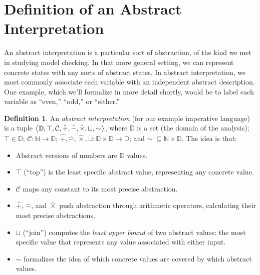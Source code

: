\documentclass{amsbook}
\theoremstyle{definition}
\newtheorem{definition}[theorem]{Definition}
\theoremstyle{remark}
\numberwithin{section}{chapter}
\numberwithin{equation}{chapter}
\begin{document}
\section{Definition of an Abstract Interpretation}

An abstract interpretation is a particular sort of abstraction, of the kind we met in studying model checking.
In that more general setting, we can represent concrete states with any sorts of abstract states.
In abstract interpretation, we most commonly associate each variable with an independent abstract description.
One example, which we'll formalize in more detail shortly, would be to label each variable as ``even,'' ``odd,'' or ``either.''

\newcommand{\join}[0]{\sqcup}

\begin{definition}
  An \emph{abstract interpretation} (for our example imperative language) is a tuple $\angled{\mathbb D, \top, \mathcal C, \hat{+}, \hat{-}, \hat{\times}, \join, \sim}$, where $\mathbb D$ is a set (the domain of the analysis); $\top \in \mathbb D$; $\mathcal C : \mathbb N \to \mathbb D$; $\hat{+}, \hat{-}, \hat{\times}, \join : \mathbb D \times \mathbb D \to \mathbb D$; and $\sim \; \subseteq \mathbb N \times \mathbb D$.
  The idea is that:
  \begin{itemize}
  \item Abstract versions of numbers are $\mathbb D$ values.
  \item $\top$ (``top'') is the least specific abstract value, representing any concrete value.
  \item $\mathcal C$ maps any constant to its most precise abstraction.
  \item $\hat{+}$, $\hat{-}$, and $\hat{\times}$ push abstraction through arithmetic operators, calculating their most precise abstractions.
  \item $\join$ (``join'') computes the \emph{least upper bound} of two abstract values: the most specific value that represents any value associated with either input.
  \item $\sim$ formalizes the idea of which concrete values are covered by which abstract values.
  \end{itemize}


\end{definition}
\end{document}
